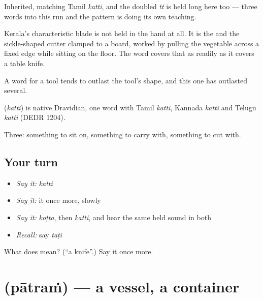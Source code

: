 Inherited, matching Tamil \emph{katti}, and the doubled \emph{tt} is held long here too — three words into this run and the pattern is doing its own teaching.

Kerala's characteristic blade is not held in the hand at all. It is the  and the sickle-shaped cutter clamped to a board, worked by pulling the vegetable across a fixed edge while sitting on the floor. The word covers that as readily as it covers a table knife.

A word for a tool tends to outlast the tool's shape, and this one has outlasted several.

\begin{cousinweb}
\textbf{} (\emph{katti}) is native Dravidian, one word with Tamil \emph{katti}, Kannada \emph{katti} and Telugu \emph{katti} (DEDR 1204).
\end{cousinweb}

\begin{grammarlens}[title={What you've built}]
Three: something to sit on, something to carry with, something to cut with.
\end{grammarlens}

\subsection*{Your turn}
\begin{itemize}
\raggedright
  \item \emph{Say it:} \emph{katti}
  \item \emph{Say it:} it once more, slowly
  \item \emph{Say it:} \emph{koṭṭa}, then \emph{katti}, and hear the same held sound in both
  \item \emph{Recall:} say \emph{taṭi}
\end{itemize}

\begin{tcolorbox}[breakable,colback=teal!4,colframe=teal!35!black,title={Before you move on}]
What does  mean? (\textquotedblleft{}a knife\textquotedblright{}.) Say it once more.
\end{tcolorbox}
\section[\texorpdfstring{\ml{പാത്രം} (pātraṁ)}{പാത്രം (pātraṁ)}]{ (pātraṁ) — a vessel, a container}

\label{lesson:ML-C56-vessel}



